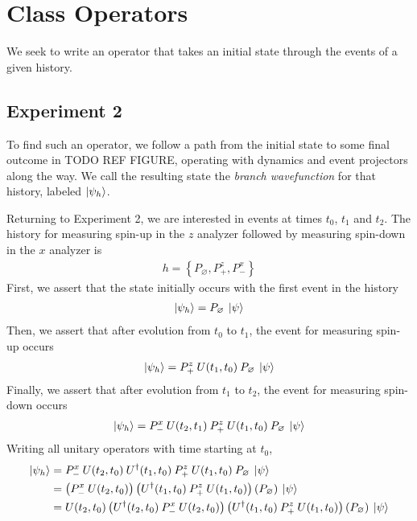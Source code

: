 \section{Class Operators}
We seek to write an operator that takes an initial state through the events of a given history.

\subsection{Experiment 2}

To find such an operator, we follow a path from the initial state to some final outcome in TODO REF FIGURE, operating with dynamics and event projectors along the way. We call the resulting state the \textit{branch wavefunction} for that history, labeled $\ket{\psi_h}$.

Returning to Experiment 2, we are interested in events at times $t_0$, $t_1$ and $t_2$. The history for measuring spin-up in the $z$ analyzer followed by measuring spin-down in the $x$ analyzer is
\begin{align}
  h = \left\{ P_\varnothing, P^z_+ ,P^x_- \right\}
\end{align}
%
First, we assert that the state initially occurs with the first event in the history
\begin{align}
  \ket{\psi_h} = P_\varnothing \: \ket{\psi}
\end{align}
Then, we assert that after evolution from $t_0$ to $t_1$, the event for measuring spin-up occurs
\begin{align}
  \ket{\psi_h} = P^z_+ \: U(t_1, t_0) \: P_\varnothing \: \ket{\psi}
\end{align}
Finally, we assert that after evolution from $t_1$ to $t_2$, the event for measuring spin-down occurs
\begin{align}
  \ket{\psi_h} = P^x_- \: U(t_2, t_1) \: P^z_+ \: U(t_1, t_0) \: P_\varnothing \: \ket{\psi}
\end{align}
Writing all unitary operators with time starting at $t_0$,
\begin{align}
  \ket{\psi_h} &= P^x_- \: U(t_2, t_0) \: U^\dagger(t_1, t_0) \: P^z_+ \: U(t_1, t_0) \: P_\varnothing \: \ket{\psi} \\ \nonumber
  &= \left(P^x_- \: U(t_2, t_0) \right) \left( U^\dagger(t_1, t_0) \: P^z_+ \: U(t_1, t_0) \right) \left( P_\varnothing \right) \: \ket{\psi} \\ \nonumber
  &= U(t_2, t_0)\left(U^\dagger(t_2, t_0) \: P^x_- \: U(t_2, t_0) \right) \left( U^\dagger(t_1, t_0) \: P^z_+ \: U(t_1, t_0) \right) \left( P_\varnothing \right) \: \ket{\psi}
\end{align}
